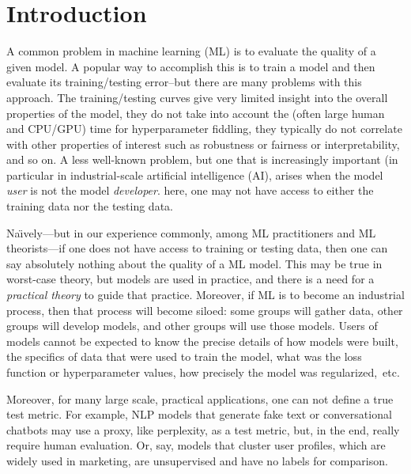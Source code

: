 
\section{Introduction}
\label{sxn:intro}

A common problem in machine learning (ML) 
is to evaluate the quality of a given model.
A popular way to accomplish this
is to train a model and then evaluate its training/testing error--but
there are many problems with this approach.
The training/testing curves give very limited insight into the overall properties of the model, 
they do not take into account the (often large human and CPU/GPU) time for hyperparameter fiddling,
they typically do not correlate with other properties of interest such as robustness or fairness or interpretability, 
and so on.
A less well-known problem, but one that is increasingly important (in particular in industrial-scale 
artificial intelligence (AI), arises when the model \emph{user} is not the model \emph{developer}.
here, one may not have access to either the training data nor the testing data.

Na\"{\i}vely---but in our experience commonly, among ML practitioners and ML theorists---if one does not have access to training or testing data, then one can say absolutely nothing about the quality of a ML model.
This may be true in worst-case theory, but models are used in practice, and there is a need for a \emph{practical theory} to guide that practice.
Moreover, if ML is to become an industrial process, then that process will become siloed: some groups will gather data, other groups will develop models, and other groups will use those models.
Users of models cannot be expected to know the precise details of how models were built, the specifics of data that were used to train the model, what was the loss function or hyperparameter values, how precisely the model was regularized,~etc.

Moreover, for many large scale, practical applications, one can not define a true test metric.  For example, NLP models that generate fake text or conversational chatbots may use a proxy, like perplexity, as a test metric, but, in the end, really require human evaluation.  Or, say, models that cluster user profiles, which are widely used in marketing, are unsupervised and have no labels for comparison.  


